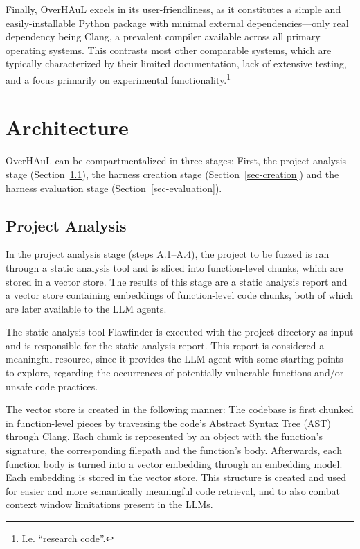 \documentclass[
  a4paper,
  DIV=11,
  numbers=noendperiod]{scrreprt}
\theoremstyle{definition}
\theoremstyle{remark}
\begin{document}
Finally, OverHAuL excels in its user-friendliness, as it constitutes a
simple and easily-installable Python package with minimal external
dependencies---only real dependency being Clang, a prevalent compiler
available across all primary operating systems. This contrasts most
other comparable systems, which are typically characterized by their
limited documentation, lack of extensive testing, and a focus primarily
on experimental functionality.\footnote{I.e. ``research code''.}

\section{Architecture}\label{architecture}

OverHAuL can be compartmentalized in three stages: First, the project
analysis stage (Section~\ref{sec-analysis}), the harness creation stage
(Section~\ref{sec-creation}) and the harness evaluation stage
(Section~\ref{sec-evaluation}).

\subsection{Project Analysis}\label{sec-analysis}

In the project analysis stage (steps A.1--A.4), the project to be fuzzed
is ran through a static analysis tool and is sliced into function-level
chunks, which are stored in a vector store. The results of this stage
are a static analysis report and a vector store containing embeddings of
function-level code chunks, both of which are later available to the LLM
agents.

The static analysis tool Flawfinder \autocite{flawfinder} is executed
with the project directory as input and is responsible for the static
analysis report. This report is considered a meaningful resource, since
it provides the LLM agent with some starting points to explore,
regarding the occurrences of potentially vulnerable functions and/or
unsafe code practices.

The vector store is created in the following manner: The codebase is
first chunked in function-level pieces by traversing the code's Abstract
Syntax Tree (AST) through Clang. Each chunk is represented by an object
with the function's signature, the corresponding filepath and the
function's body. Afterwards, each function body is turned into a vector
embedding through an embedding model. Each embedding is stored in the
vector store. This structure is created and used for easier and more
semantically meaningful code retrieval, and to also combat context
window limitations present in the LLMs.
\end{document}
